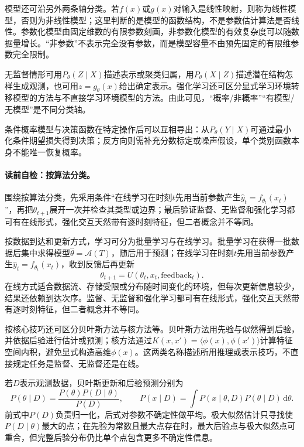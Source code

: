 模型还可沿另外两条轴分类。若$f(x)$或$g(x)$对输入是线性映射，则称为线性模型，否则为非线性模型；这里判断的是模型的函数结构，不是参数估计算法是否线性。参数化模型由固定维数的有限参数刻画，非参数化模型的有效复杂度可以随数据量增长。“非参数”不表示完全没有参数，而是模型容量不由预先固定的有限维参数完全限制。

无监督情形可用$P_\theta(Z\mid X)$描述表示或聚类归属，用$P_\theta(X\mid Z)$描述潜在结构怎样生成观测，也可用$z=g_\theta(x)$给出确定表示。强化学习还可区分显式学习环境转移模型的方法与不直接学习环境模型的方法。由此可见，“概率/非概率”“有模型/无模型”是不同分类轴。

条件概率模型与决策函数在特定操作后可以互相导出：从$P_\theta(Y\mid X)$可通过最小化条件期望损失得到决策；反方向则需补充分数标定或噪声假设，单个类别函数本身不能唯一恢复概率。


\paragraph{读前自检：按算法分类。}围绕按算法分类，先采用条件“在线学习在时刻$t$先用当前参数产生$\widehat y_t=f_{\theta_t}(x_t)$”，再把$\theta_{t+1}$展开一次并检查其类型或边界；最后验证监督、无监督和强化学习都可有在线形式，强化交互天然带有逐时刻特征，但二者概念并不等同。\par

按数据到达和更新方式，学习可分为批量学习与在线学习。批量学习在获得一批数据后集中求得模型$\widehat\theta=\mathcal A(T)$，随后用于预测；在线学习在时刻$t$先用当前参数产生$\widehat y_t=f_{\theta_t}(x_t)$，收到反馈后再更新
\[
\theta_{t+1}=U(\theta_t,x_t,\text{feedback}_t).
\]
在线方式适合数据流、存储受限或分布随时间变化的环境，但每次更新信息较少，结果还依赖到达次序。监督、无监督和强化学习都可有在线形式，强化交互天然带有逐时刻特征，但二者概念并不等同。

按核心技巧还可区分贝叶斯方法与核方法等。贝叶斯方法用先验与似然得到后验，并依据后验进行估计或预测；核方法通过$K(x,x')=\langle\phi(x),\phi(x')\rangle$计算特征空间内积，避免显式构造高维$\phi(x)$。这两类名称描述所用推理或表示技巧，不直接规定任务是监督、无监督还是在线。

若$D$表示观测数据，贝叶斯更新和后验预测分别为
\[
P(\theta\mid D)=\frac{P(\theta)P(D\mid\theta)}{P(D)},\qquad
P(x\mid D)=\int P(x\mid\theta,D)P(\theta\mid D)\,\mathrm d\theta.
\]
前式中$P(D)$负责归一化，后式对参数不确定性做平均。极大似然估计只寻找使$P(D\mid\theta)$最大的点；在先验为常数且最大点存在时，最大后验点与极大似然点可重合，但完整后验分布仍比单个点包含更多不确定性信息。

